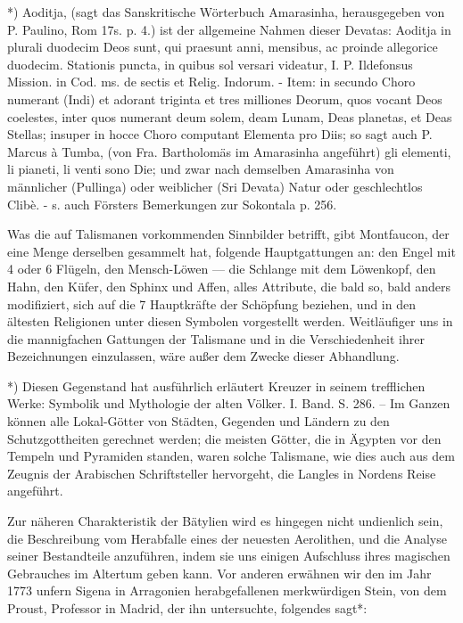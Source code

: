 \documentclass[a4paper, 11pt, oneside, polutonikogreek, german]{article}
\begin{document}
*) Aoditja, (sagt das Sanskritische Wörterbuch Amarasinha, herausgegeben von P. Paulino, Rom 17s. p. 4.) ist der allgemeine Nahmen dieser Devatas: Aoditja in plurali duodecim Deos sunt, qui praesunt anni, mensibus, ac proinde allegorice duodecim. Stationis puncta, in quibus sol versari videatur, I. P. Ildefonsus Mission. in Cod. ms. de sectis et Relig. Indorum. - Item: in secundo Choro numerant (Indi) et adorant triginta et tres milliones Deorum, quos vocant Deos coelestes, inter quos numerant deum solem, deam Lunam, Deas planetas, et Deas Stellas; insuper in hocce Choro computant Elementa pro Diis; so sagt auch P. Marcus à Tumba, (von Fra. Bartholomäs im Amarasinha angeführt) gli elementi, li pianeti, li venti sono Die; und zwar nach demselben Amarasinha von männlicher (Pullinga) oder weiblicher (Sri Devata) Natur oder geschlechtlos Clibè. - s. auch Försters Bemerkungen zur Sokontala p. 256.

Was die auf Talismanen vorkommenden Sinnbilder betrifft, gibt Montfaucon, der eine Menge derselben gesammelt hat, folgende Hauptgattungen an: den Engel mit 4 oder 6 Flügeln, den Mensch-Löwen --- die Schlange mit dem Löwenkopf, den Hahn, den Küfer, den Sphinx und Affen, alles Attribute, die bald so, bald anders modifiziert, sich auf die 7 Hauptkräfte der Schöpfung beziehen, und in den ältesten Religionen unter diesen Symbolen vorgestellt werden. Weitläufiger uns in die mannigfachen Gattungen der Talismane und in die Verschiedenheit ihrer Bezeichnungen einzulassen, wäre außer dem Zwecke dieser Abhandlung.

*) Diesen Gegenstand hat ausführlich erläutert Kreuzer in seinem trefflichen Werke: Symbolik und Mythologie der alten Völker. I. Band. S. 286. -- Im Ganzen können alle Lokal-Götter von Städten, Gegenden und Ländern zu den Schutzgottheiten gerechnet werden; die meisten Götter, die in Ägypten vor den Tempeln und Pyramiden standen, waren solche Talismane, wie dies auch aus dem Zeugnis der Arabischen Schriftsteller hervorgeht, die Langles in Nordens Reise angeführt.

Zur näheren Charakteristik der Bätylien wird es hingegen nicht undienlich sein, die Beschreibung vom Herabfalle eines der neuesten Aerolithen, und die Analyse seiner Bestandteile anzuführen, indem sie uns einigen Aufschluss ihres magischen Gebrauches im Altertum geben kann. Vor anderen erwähnen wir den im Jahr 1773 unfern Sigena in Arragonien herabgefallenen merkwürdigen Stein, von dem Proust, Professor in Madrid, der ihn untersuchte, folgendes sagt*:
\end{document}
